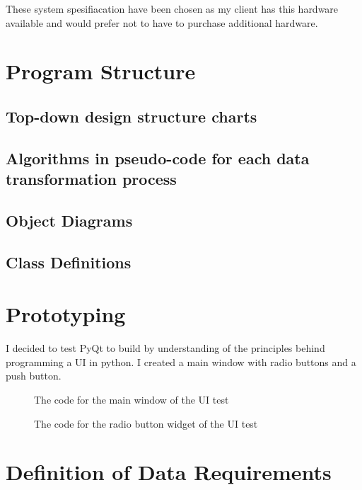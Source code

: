 These system spesifiacation have been chosen as my client has this hardware available and would prefer not to have to purchase additional hardware.

\section{Program Structure}

\subsection{Top-down design structure charts}

\subsection{Algorithms in pseudo-code for each data transformation process}

\subsection{Object Diagrams}

\subsection{Class Definitions}

\section{Prototyping}
I decided  to test PyQt to build by understanding of the principles behind programming a UI in python. I created a main window with radio buttons and a push button.

\begin{figure}[H]
    \caption{The code for the main window of the UI test} \label{fig:The code for the main window of the UI test}
\end{figure}

\begin{figure}[H]
    \caption{The code for the radio button widget of the UI test} \label{fig:The code for the radio button widget of the UI test}
\end{figure}

\section{Definition of Data Requirements}

